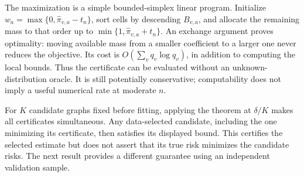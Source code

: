 The maximization is a simple bounded-simplex linear program. Initialize
$w_a=\max\{0,\widehat\pi_{v,a}-t_n\}$, sort cells by descending
$B_{v,a}$, and allocate the remaining mass to that order up to
$\min\{1,\widehat\pi_{v,a}+t_n\}$. An exchange argument proves
optimality: moving available mass from a smaller coefficient to a
larger one never reduces the objective. Its cost is
$O(\sum_v q_v\log q_v)$, in addition to computing the local bounds.
Thus the certificate can be evaluated without an unknown-distribution
oracle. It is still potentially conservative; computability does not
imply a useful numerical rate at moderate $n$.

For $K$ candidate graphs fixed before fitting, applying the theorem at
$\delta/K$ makes all certificates simultaneous. Any data-selected
candidate, including the one minimizing its certificate, then satisfies
its displayed bound. This certifies the selected estimate but does not
assert that its true risk minimizes the candidate risks.
The next result provides a different guarantee using an independent
validation sample.
